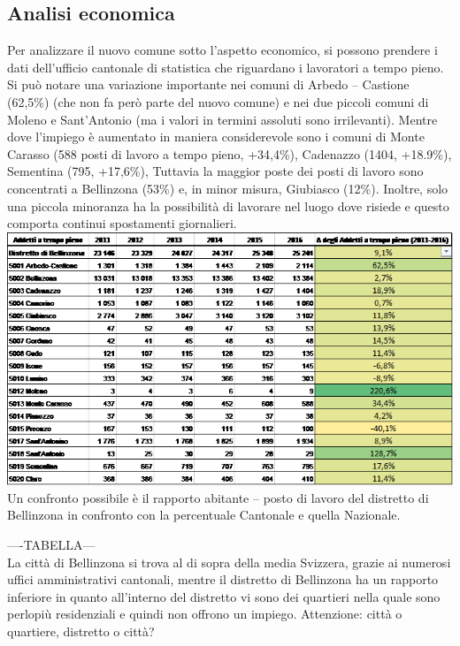 \subsection{Analisi economica}
Per analizzare il nuovo comune sotto l’aspetto economico, si possono prendere i dati dell’ufficio cantonale di statistica che riguardano i lavoratori a tempo pieno. Si può notare una variazione importante nei comuni di Arbedo – Castione (62,5\%) (che non fa però parte del nuovo comune) e nei due piccoli comuni di Moleno e Sant’Antonio (ma i valori in termini assoluti sono irrilevanti). Mentre dove l’impiego è aumentato in maniera considerevole sono i comuni di Monte Carasso (588 posti di lavoro a tempo pieno, +34,4\%), Cadenazzo (1404, +18.9\%), Sementina (795, +17,6\%), Tuttavia la maggior poste dei posti di lavoro sono concentrati a Bellinzona (53\%) e, in minor misura, Giubiasco (12\%). Inoltre, solo una piccola minoranza ha la possibilità di lavorare nel luogo dove risiede e questo comporta continui spostamenti giornalieri.  
\\
\includegraphics[scale=0.5]{Capitoli/ioioi.png}
\\Un confronto possibile è il rapporto abitante – posto di lavoro del distretto di Bellinzona in confronto con la percentuale Cantonale e quella Nazionale.

----TABELLA---
\\
La città di Bellinzona si trova al di sopra della media Svizzera, grazie ai numerosi uffici amministrativi cantonali, mentre il distretto di Bellinzona ha un rapporto inferiore in quanto all’interno del distretto vi sono dei quartieri nella quale sono perlopiù residenziali e quindi non offrono un impiego. Attenzione: città o quartiere, distretto o città?


